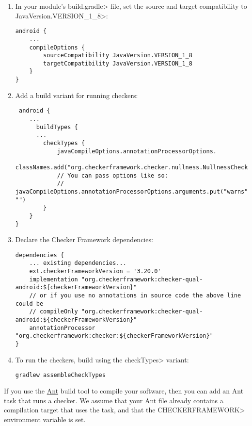\begin{enumerate}

\item In your module's \<build.gradle> file, set the source and target
  compatibility to \<JavaVersion.VERSION\_1\_8>:

\begin{Verbatim}
android {
    ...
    compileOptions {
        sourceCompatibility JavaVersion.VERSION_1_8
        targetCompatibility JavaVersion.VERSION_1_8
    }
}
\end{Verbatim}

\item Add a build variant for running checkers:

 \begin{Verbatim}
 android {
    ...
      buildTypes {
      ...
        checkTypes {
            javaCompileOptions.annotationProcessorOptions.
                    classNames.add("org.checkerframework.checker.nullness.NullnessChecker")
            // You can pass options like so:
            // javaCompileOptions.annotationProcessorOptions.arguments.put("warns", "")
        }
    }
}
\end{Verbatim}

\item Declare the Checker Framework dependencies:

\begin{mysmall}
\begin{Verbatim}
dependencies {
    ... existing dependencies...
    ext.checkerFrameworkVersion = '3.20.0'
    implementation "org.checkerframework:checker-qual-android:${checkerFrameworkVersion}"
    // or if you use no annotations in source code the above line could be
    // compileOnly "org.checkerframework:checker-qual-android:${checkerFrameworkVersion}"
    annotationProcessor "org.checkerframework:checker:${checkerFrameworkVersion}"
}
\end{Verbatim}
\end{mysmall}

\item To run the checkers, build using the \<checkTypes> variant:
\begin{Verbatim}
gradlew assembleCheckTypes
\end{Verbatim}

\end{enumerate}



If you use the \href{http://ant.apache.org/}{Ant} build tool to compile
your software, then you can add an Ant task that runs a checker.  We assume
that your Ant file already contains a compilation target that uses the
 task, and that the \<CHECKERFRAMEWORK> environment variable is set.

